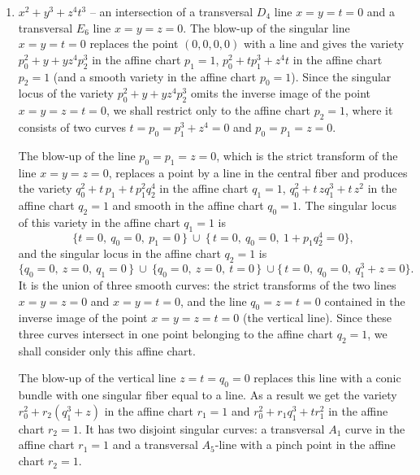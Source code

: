 \documentclass[a4paper]{amsart}
\theoremstyle{plain}
\theoremstyle{definition}
\theoremstyle{remark}
\numberwithin{equation}{section}
\begin{document}
\begin{enumerate}[itemsep=2mm plus 2mm]
\begin{center}
\end{center}
with $e=5.$ Consequently
\[
\Delta N_{c}=1,\;\; \Delta e=1+1+(3+2-2)+2+2+1 = 10.
\]
\item $x^2 + y^3 + z^4 t^3$ -- an intersection of a transversal $D_{4}$ line $x=y=t=0$ and a transversal $E_{6}$ line $x=y=z=0$. The blow-up of the singular line $x=y=t=0$ replaces the point $(0,0,0,0)$ with a line and
gives the variety
$p_{0}^{2}+y+yz^{4}p_{2}^{3}$ in the affine chart $p_{1}=1$,
$p_{0}^{2}+tp_{1}^{3}+z^{4}t$ in the affine chart $p_{2}=1$ (and a smooth variety in the affine chart $p_{0}=1$). Since the singular locus of the variety $p_{0}^{2}+y+yz^{4}p_{2}^{3}$ omits the inverse image of the point $x=y=z=t=0$, we shall restrict only to the affine chart $p_{2}=1$, where it consists of two curves $t= p_0= p_1^3+z^4=0$ and $p_0=p_1=z=0$.

The blow-up of the line $p_{0}=p_{1}=z=0$, which is the strict transform of the line $x=y=z=0$, replaces a point by a line in the central fiber and produces the variety
$q_0^2+t\,p_1+t\,p_1^2q_2^4$ in the affine chart $q_{1}=1$, $q_0^2+t\,zq_1^3+t\,z^2$ in the affine chart $q_{2}=1$ and smooth in the affine chart $q_{0}=1$.
The singular locus of this variety in the affine chart $q_{1}=1$ is
\[
\{t=0,\ q_0=0,\ p_1=0\,\}\ \cup\ \{\,t=0,\ q_0=0,\ 1+p_1q_2^4=0\},
\]
and the singular locus in the affine chart $q_{2}=1$
is
\[
\{q_0=0,\ z=0,\ q_1=0\,\}\ \cup\ \{q_0=0,\ z=0,\ t=0\,\}\ \cup\{\,t=0,\ q_0=0,\ q_1^3+z=0\}.
\]
It is the union of three smooth curves: the strict transforms of the two lines $x=y=z=0$ and $x=y=t=0$, and the line $q_{0}=z=t=0$ contained in the inverse image of the point $x=y=z=t=0$ (the vertical line).
Since these three curves intersect in one point belonging to the affine chart $q_{2}=1$, we shall consider only this affine chart.

The blow-up of the vertical line $z=t=q_{0}=0$ replaces this line with a conic bundle with one singular fiber equal to a line. As a result we get the variety $r_{0}^{2}+r_{2}(q_{1}^{3}+z)$ in the affine chart $r_{1}=1$ and $r_{0}^{2}+r_{1}q_{1}^{3}+tr_{1}^{2}$ in the affine chart $r_{2}=1$.
It has two disjoint singular curves: a transversal $A_{1}$ curve in the affine chart $r_{1}=1$
and a transversal $A_{5}$-line with a pinch point in the affine chart $r_{2}=1$.


\end{enumerate}
\end{document}
